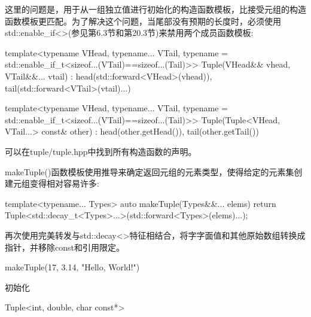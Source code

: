 这里的问题是，用于从一组独立值进行初始化的构造函数模板，比接受元组的构造函数模板更匹配。为了解决这个问题，当尾部没有预期的长度时，必须使用std::enable\_if<>(参见第6.3节和第20.3节)来禁用两个成员函数模板:

\begin{cpp}
template<typename VHead, typename... VTail,
		typename = std::enable_if_t<sizeof...(VTail)==sizeof...(Tail)>>
Tuple(VHead&& vhead, VTail&&... vtail)
: head(std::forward<VHead>(vhead)),
tail(std::forward<VTail>(vtail)...) { }

template<typename VHead, typename... VTail,
		typename = std::enable_if_t<sizeof...(VTail)==sizeof...(Tail)>>
Tuple(Tuple<VHead, VTail...> const& other)
: head(other.getHead()), tail(other.getTail()) { }
\end{cpp}

可以在tuple/tuple.hpp中找到所有构造函数的声明。

makeTuple()函数模板使用推导来确定返回元组的元素类型，使得给定的元素集创建元组变得相对容易许多:

\begin{cpp}
template<typename... Types>
auto makeTuple(Types&&... elems)
{
	return Tuple<std::decay_t<Types>...>(std::forward<Types>(elems)...);
}
\end{cpp}

再次使用完美转发与std::decay<>特征相结合，将字字面值和其他原始数组转换成指针，并移除const和引用限定。

\begin{cpp}
makeTuple(17, 3.14, "Hello, World!")
\end{cpp}

初始化

\begin{cpp}
Tuple<int, double, char const*>
\end{cpp}







